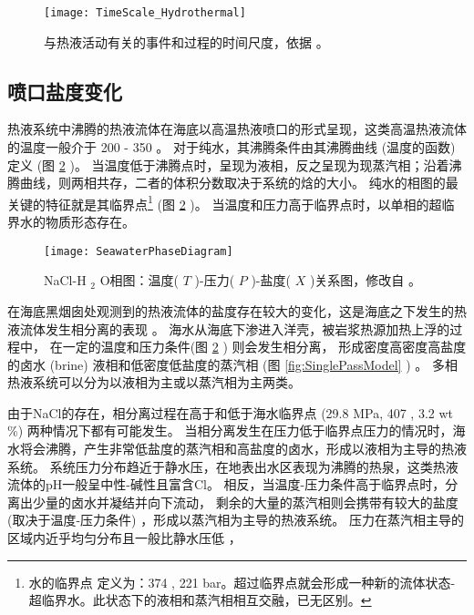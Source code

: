 \begin{figure} [htbp]
	\centering%
	\texttt{[image: TimeScale\_Hydrothermal]} 
	\caption[热液活动时间尺度]{与热液活动有关的事件和过程的时间尺度，依据 \cite{LOWELL2014} 。} 
	\label{fig:TimeScale_Hydrothermal} 
\end{figure} 

\subsection{喷口盐度变化}  %
热液系统中沸腾的热液流体在海底以高温热液喷口的形式呈现，这类高温热液流体的温度一般介于 200 - 350 \ssd 。
对于纯水，其沸腾条件由其沸腾曲线 (温度的函数) 定义 (图 \ref{fig:PhaseDiagram_Seawater} )。
当温度低于沸腾点时，呈现为液相，反之呈现为现蒸汽相；沿着沸腾曲线，则两相共存，二者的体积分数取决于系统的焓的大小。
纯水的相图的最关键的特征就是其临界点\footnote{水的临界点 定义为：374 \ssd, 221 bar。超过临界点就会形成一种新的流体状态-超临界水。此状态下的液相和蒸汽相相互交融，已无区别。 }  (图 \ref{fig:PhaseDiagram_Seawater} )。
当温度和压力高于临界点时，以单相的超临界水的物质形态存在。

\begin{figure} [htbp]
	\centering%
	\texttt{[image: SeawaterPhaseDiagram]} 
	\caption[海水相图]{NaCl-H $ _2 $ O相图：温度( $ T $ )-压力( $ P $ )-盐度( $ X $ )关系图，修改自 \cite{driesner2007system_part1} 。} 
	\label{fig:PhaseDiagram_Seawater} 
\end{figure} 
在海底黑烟囱处观测到的热液流体的盐度存在较大的变化，这是海底之下发生的热液流体发生相分离的表现 \citep{von1995evolution,von2003extraordinary} 。
海水从海底下渗进入洋壳，被岩浆热源加热上浮的过程中，
在一定的温度和压力条件(图 \ref{fig:PhaseDiagram_Seawater} ) 则会发生相分离，
形成密度高密度高盐度的卤水 (brine) 液相和低密度低盐度的蒸汽相 (图 \ref{fig:SinglePassModel} ) 。
多相热液系统可以分为以液相为主或以蒸汽相为主两类。

由于NaCl的存在，相分离过程在高于和低于海水临界点 (29.8 MPa, 407 \ssd, 3.2 wt \%) 两种情况下都有可能发生。
当相分离发生在压力低于临界点压力的情况时，海水将会沸腾，产生非常低盐度的蒸汽相和高盐度的卤水，形成以液相为主导的热液系统。
系统压力分布趋近于静水压，在地表出水区表现为沸腾的热泉，这类热液流体的pH一般呈中性-碱性且富含Cl。
相反，当温度-压力条件高于临界点时，分离出少量的卤水并凝结并向下流动，
剩余的大量的蒸汽相则会携带有较大的盐度 (取决于温度-压力条件)  \citep{coumou2009phase} ，形成以蒸汽相为主导的热液系统。
压力在蒸汽相主导的区域内近乎均匀分布且一般比静水压低 \citep{white1971vapor} ，


